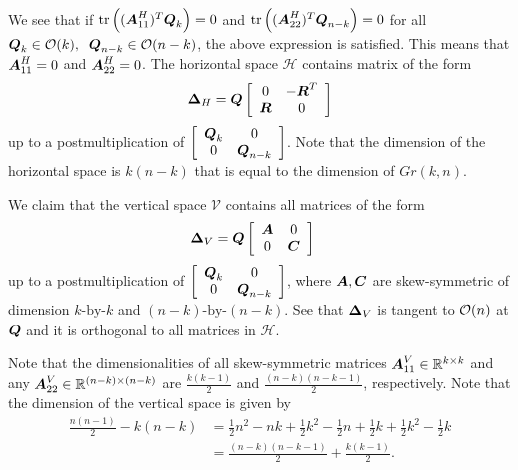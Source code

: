 \documentclass[11pt]{article}
\begin{document}
\begin{enumerate}
\begin{align*}
\end{align*}
We see that if $\mathrm{tr}\left((\boldsymbol{A}_{11}^{H})^{T}\boldsymbol{Q}_{k} \right) = 0$ and $\mathrm{tr}\left((\boldsymbol{A}_{22}^{H})^{T}\boldsymbol{Q}_{n-k} \right)=0$ for all $\boldsymbol{Q}_{k}\in {\mathcal O}(k), \;\; \boldsymbol{Q}_{n-k} \in {\mathcal O}(n-k)$, the above expression is satisfied. This means that $\boldsymbol{A}_{11}^{H}= 0$ and $\boldsymbol{A}_{22}^{H}= 0$. The horizontal space $\mathcal{H}$ contains matrix of the form 
\begin{align*}
\boldsymbol{\Delta}_{H} = \boldsymbol{Q}\left[\begin{array}{cc}
0 & -\boldsymbol{R}^{T} \\ 
\boldsymbol{R} & 0
\end{array} \right]
\end{align*} up to a postmultiplication of $\left[\begin{array}{cc}
\boldsymbol{Q}_{k} & 0 \\ 
0 & \boldsymbol{Q}_{n-k}
\end{array} \right]$. Note that the dimension of the horizontal space is $k(n-k)$ that is equal to the dimension of $Gr(k,n)$.  

We claim that the vertical space $\mathcal{V}$ contains all matrices of the form 
\begin{align*}
\boldsymbol{\Delta}_{V} &= \boldsymbol{Q}\left[\begin{array}{cc}
\boldsymbol{A} & 0 \\ 
0 & \boldsymbol{C}
\end{array} \right]
\end{align*} up to a postmultiplication of $\left[\begin{array}{cc}
\boldsymbol{Q}_{k} & 0 \\ 
0 & \boldsymbol{Q}_{n-k}
\end{array} \right]$, where $\boldsymbol{A}, \boldsymbol{C}$ are skew-symmetric of dimension $k \text{-by-} k$ and $(n-k)\text{-by-} (n-k)$. See that $\boldsymbol{\Delta}_{V}$ is tangent to ${\mathcal O}(n)$ at $\boldsymbol{Q}$ and it is orthogonal to all matrices in $\mathcal{H}$.

Note that the dimensionalities of all skew-symmetric matrices $\boldsymbol{A}_{11}^{V} \in {\mathbb R}^{k\times k}$ and  any $\boldsymbol{A}_{22}^{V}\in {\mathbb R}^{(n-k)\times (n-k)}$ are $\frac{k(k-1)}{2}$ and $\frac{(n-k)(n-k-1)}{2}$, respectively. Note that the dimension of the vertical space is given by 
\begin{align*}
\frac{n(n-1)}{2} - k(n-k) &= \frac{1}{2}n^{2} - nk+ \frac{1}{2}k^{2} - \frac{1}{2}n+ \frac{1}{2}k + \frac{1}{2}k^{2}-\frac{1}{2}k \\
&=\frac{(n-k)(n-k-1)}{2} + \frac{k(k-1)}{2}.
\end{align*}


\end{enumerate}
\end{document}

